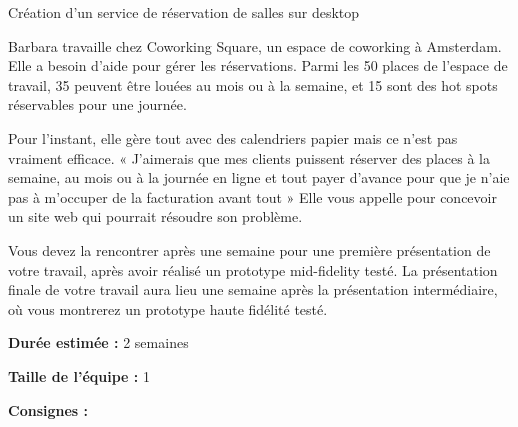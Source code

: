 \makeheaderfiles

Création d'un service de réservation de salles sur desktop

Barbara travaille chez Coworking Square, un espace de coworking à Amsterdam.
Elle a besoin d'aide pour gérer les réservations. Parmi les 50 places de l'espace de travail, 35 peuvent être louées au mois ou à la semaine, et 15 sont des hot spots réservables pour une journée.

Pour l'instant, elle gère tout avec des calendriers papier mais ce n'est pas vraiment efficace.
« J'aimerais que mes clients puissent réserver des places à la semaine, au mois ou à la journée en ligne et tout payer d'avance pour que je n'aie pas à m'occuper de la facturation avant tout »
Elle vous appelle pour concevoir un site web qui pourrait résoudre son problème.

Vous devez la rencontrer après une semaine pour une première présentation de votre travail, après avoir réalisé un prototype mid-fidelity testé.
La présentation finale de votre travail aura lieu une semaine après la présentation intermédiaire, où vous montrerez un prototype haute fidélité testé.

\textbf{Durée estimée :} 2 semaines

\textbf{Taille de l'équipe :} 1

\textbf{Consignes :}

